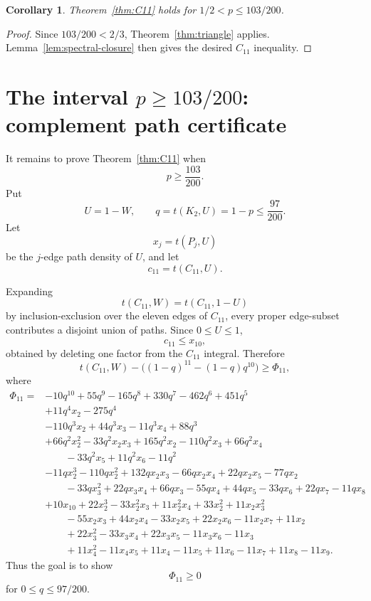 \documentclass[11pt]{article}
\newtheorem{corollary}[theorem]{Corollary}
\begin{document}
\begin{corollary}\label{cor:near-bipartite}
Theorem~\ref{thm:C11} holds for $1/2<p\le103/200$.
\end{corollary}

\begin{proof}
Since $103/200<2/3$, Theorem~\ref{thm:triangle} applies.  Lemma~\ref{lem:spectral-closure} then gives the desired $C_{11}$ inequality.
\end{proof}

\section{The interval $p\ge103/200$: complement path certificate}

It remains to prove Theorem~\ref{thm:C11} when
\[
        p\ge\frac{103}{200}.
\]
Put
\[
        U=1-W,
        \qquad q=t(K_2,U)=1-p\le\frac{97}{200}.
\]
Let
\[
        x_j=t(P_j,U)
\]
be the $j$-edge path density of $U$, and let
\[
        c_{11}=t(C_{11},U).
\]

Expanding
\[
        t(C_{11},W)=t(C_{11},1-U)
\]
by inclusion-exclusion over the eleven edges of $C_{11}$, every proper edge-subset contributes a disjoint union of paths.  Since $0\le U\le1$,
\[
        c_{11}\le x_{10},
\]
obtained by deleting one factor from the $C_{11}$ integral.  Therefore
\[
        t(C_{11},W)-\bigl((1-q)^{11}-(1-q)q^{10}\bigr)
        \ge \Phi_{11},
\]
where
\begin{align*}
\Phi_{11}={}&
-10q^{10}+55q^9-165q^8+330q^7-462q^6+451q^5 \\
&+11q^4x_2-275q^4 \\
&-110q^3x_2+44q^3x_3-11q^3x_4+88q^3 \\
&+66q^2x_2^2-33q^2x_2x_3+165q^2x_2-110q^2x_3+66q^2x_4 \\
&\qquad -33q^2x_5+11q^2x_6-11q^2 \\
&-11qx_2^3-110qx_2^2+132qx_2x_3-66qx_2x_4+22qx_2x_5-77qx_2 \\
&\qquad -33qx_3^2+22qx_3x_4+66qx_3-55qx_4+44qx_5-33qx_6+22qx_7-11qx_8 \\
&+10x_{10}+22x_2^3-33x_2^2x_3+11x_2^2x_4+33x_2^2+11x_2x_3^2 \\
&\qquad -55x_2x_3+44x_2x_4-33x_2x_5+22x_2x_6-11x_2x_7+11x_2 \\
&\qquad +22x_3^2-33x_3x_4+22x_3x_5-11x_3x_6-11x_3 \\
&\qquad +11x_4^2-11x_4x_5+11x_4-11x_5+11x_6-11x_7+11x_8-11x_9.
\end{align*}
Thus the goal is to show
\[
        \Phi_{11}\ge0
\]
for $0\le q\le97/200$.
\end{document}
